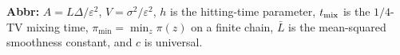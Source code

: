 \begin{table}[tp]
\begin{threeparttable}
\begin{tabularx}{\linewidth}{@{}>{\raggedright\arraybackslash}p{0.20\linewidth}>{\raggedright\arraybackslash}p{0.27\linewidth}>{\raggedright\arraybackslash}p{0.28\linewidth}>{\raggedright\arraybackslash}X@{}}
\bottomrule
\end{tabularx}
\begin{tablenotes}[flushleft]\footnotesize
\item[] \textbf{Abbr:} $A=L\Delta/\varepsilon^2$, $V=\sigma^2/\varepsilon^2$, $h$ is the hitting-time parameter, $t_{\rm mix}$ is the $1/4$-TV mixing time, $\pi_{\min}=\min_z\pi(z)$ on a finite chain, $\bar L$ is the mean-squared smoothness constant, and $c$ is universal.
\end{tablenotes}
\end{threeparttable}
\end{table}
